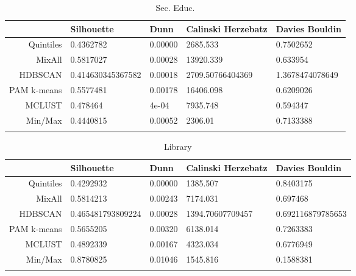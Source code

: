 \documentclass[10pt, a4paper]{article}
\begin{document}
\begin{longtable}{rllll}
  \hline
 & Silhouette & Dunn & Calinski Herzebatz & Davies Bouldin \\ 
  \hline
Quintiles & 0.4362782 & 0.00000 & 2685.533 & 0.7502652 \\ 
   \hline
MixAll & 0.5817027 & 0.00028 & 13920.339 & 0.633954 \\ 
   \hline
HDBSCAN & 0.414630345367582 & 0.00018 & 2709.50766404369 & 1.3678474078649 \\ 
   \hline
PAM k-means & 0.5577481 & 0.00178 & 16406.098 & 0.6209026 \\ 
   \hline
MCLUST & 0.478464 & 4e-04 & 7935.748 & 0.594347 \\ 
   \hline
Min/Max & 0.4440815 & 0.00052 & 2306.01 & 0.7133388 \\ 
   \hline
\hline
\caption{Sec. Educ.} 
\end{longtable}





 \pagebreak 
 
\begin{longtable}{rllll}
  \hline
 & Silhouette & Dunn & Calinski Herzebatz & Davies Bouldin \\ 
  \hline
Quintiles & 0.4292932 & 0.00000 & 1385.507 & 0.8403175 \\ 
   \hline
MixAll & 0.5814213 & 0.00243 & 7174.031 & 0.697468 \\ 
   \hline
HDBSCAN & 0.465481793809224 & 0.00028 & 1394.70607709457 & 0.692116879785653 \\ 
   \hline
PAM k-means & 0.5655205 & 0.00320 & 6138.014 & 0.7263383 \\ 
   \hline
MCLUST & 0.4892339 & 0.00167 & 4323.034 & 0.6776949 \\ 
   \hline
Min/Max & 0.8780825 & 0.01046 & 1545.816 & 0.1588381 \\ 
   \hline
\hline
\caption{Library} 
\end{longtable}





 \pagebreak 
 
\end{document}
